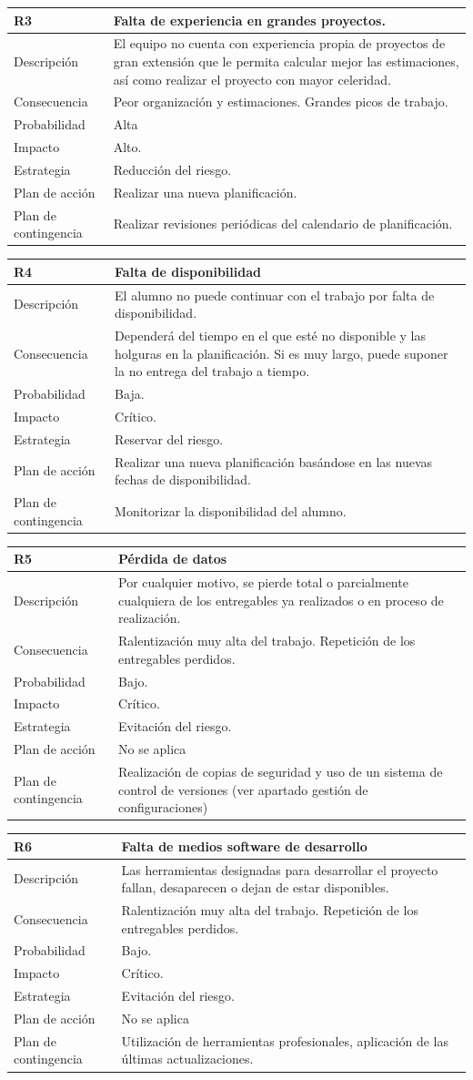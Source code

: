 \documentclass[twoside]{report}
\newcommand\addrow[2]{#1 &#2\\ }
\newcommand\addheading[2]{#1 &#2\\ \hline}
\newcommand\tabularhead{\begin{tabular}{lp{0.7\textwidth}}
\hline
}
\newenvironment{risk}{\tabularhead}
{\hline\end{tabular}}
\begin{document}
\begin{risk}
  \addheading{R3}{Falta de experiencia en grandes proyectos.}
  \addrow{Descripción}{El equipo no cuenta con experiencia propia de proyectos de gran extensión que le permita calcular mejor las estimaciones, así como realizar el proyecto con mayor celeridad.}
  \addrow{Consecuencia}{Peor organización y estimaciones. Grandes picos de trabajo.}
  \addrow{Probabilidad}{Alta }
  \addrow{Impacto}{Alto. }
  \addrow{Estrategia}{Reducción del riesgo.}
  \addrow{Plan de acción}{Realizar una nueva planificación. }
  \addrow{Plan de contingencia}{Realizar revisiones periódicas del calendario de planificación.}
\end{risk}

\vspace{0.5cm}

\begin{risk}
  \addheading{R4}{Falta de disponibilidad}
  \addrow{Descripción}{El alumno no puede continuar con el trabajo por falta de disponibilidad.}
  \addrow{Consecuencia}{Dependerá del tiempo en el que esté no disponible y las holguras en la planificación. Si es muy largo, puede suponer la no entrega del trabajo a tiempo.}
  \addrow{Probabilidad}{Baja.}
  \addrow{Impacto}{Crítico. }
  \addrow{Estrategia}{Reservar del riesgo.}
  \addrow{Plan de acción}{Realizar una nueva planificación basándose en las nuevas fechas de disponibilidad.}
  \addrow{Plan de contingencia}{Monitorizar la disponibilidad del alumno.}
\end{risk}

\vspace{0.5cm}

\begin{risk}
  \addheading{R5}{Pérdida de datos}
  \addrow{Descripción}{Por cualquier motivo, se pierde total o parcialmente cualquiera de los entregables ya realizados o en proceso de realización.}
  \addrow{Consecuencia}{Ralentización muy alta del trabajo. Repetición de los entregables perdidos. }
  \addrow{Probabilidad}{Bajo.}
  \addrow{Impacto}{Crítico. }
  \addrow{Estrategia}{Evitación del riesgo.}
  \addrow{Plan de acción}{No se aplica}
  \addrow{Plan de contingencia}{Realización de copias de seguridad y uso de un sistema de control de versiones (ver apartado gestión de configuraciones)}
\end{risk}

\vspace{0.5cm}

\begin{risk}
  \addheading{R6}{Falta de medios software de desarrollo}
  \addrow{Descripción}{Las herramientas designadas para desarrollar el proyecto fallan, desaparecen o dejan de estar disponibles.}
  \addrow{Consecuencia}{Ralentización muy alta del trabajo. Repetición de los entregables perdidos. }
  \addrow{Probabilidad}{Bajo.}
  \addrow{Impacto}{Crítico. }
  \addrow{Estrategia}{Evitación del riesgo.}
  \addrow{Plan de acción}{No se aplica}
  \addrow{Plan de contingencia}{Utilización de herramientas profesionales, aplicación de las últimas actualizaciones.}
\end{risk}
\end{document}
